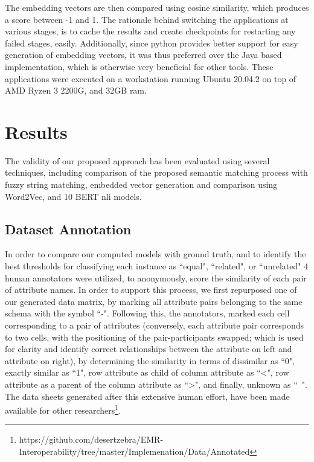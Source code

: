 \documentclass{ieeeaccess}
\begin{document}
The embedding vectors are then compared using cosine similarity, which produces a score between -1 and 1.
The rationale behind switching the applications at various stages, is to cache the results and create checkpoints for restarting any failed stages, easily. Additionally, since python provides better support for easy generation of embedding vectors, it was thus preferred over the Java based implementation, which is otherwise very beneficial for other tools. These applications were executed on a workstation running Ubuntu 20.04.2 on top of AMD Ryzen 3 2200G, and 32GB ram.

\section{Results}
\label{results}

The validity of our proposed approach has been evaluated using several techniques, including comparison of the proposed semantic matching process with fuzzy string matching, embedded vector generation and comparison using Word2Vec, and 10 BERT nli models. 

\subsection{Dataset Annotation}
In order to compare our computed models with ground truth, and to identify the best thresholds for classifying each instance as ``equal", ``related", or ``unrelated" 4 human annotators were utilized, to anonymously, score the similarity of each pair of attribute names. In order to support this process, we first repurposed one of our generated data matrix, by marking all attribute pairs belonging to the same schema with the symbol ``-". Following this, the annotators, marked each cell corresponding to a pair of attributes (conversely, each attribute pair corresponds to two cells, with the positioning of the pair-participants swapped; which is used for clarity and identify correct relationships between the attribute on left and attribute on right), by determining the similarity in terms of dissimilar as ``0", exactly similar as ``1", row attribute as child of column attribute as ``<", row attribute as a parent of the column attribute as ``>", and finally, unknown as ``~". The data sheets generated after this extensive human effort, have been made available for other researchers\footnote{https://github.com/desertzebra/EMR-Interoperability/tree/master/Implemenation/Data/Annotated}.
\end{document}
